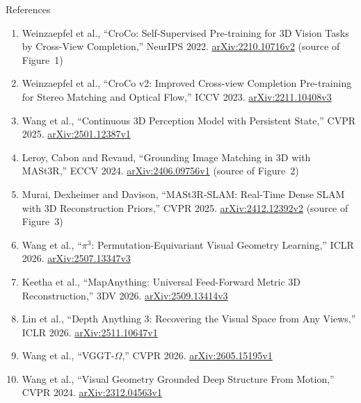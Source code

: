 \begin{frame}[allowframebreaks]{References}
\begin{enumerate}
    \item Weinzaepfel et al., ``CroCo: Self-Supervised Pre-training for 3D Vision Tasks by Cross-View Completion,'' NeurIPS 2022. \href{https://arxiv.org/abs/2210.10716v2}{arXiv:2210.10716v2} (source of Figure~1)
    \item Weinzaepfel et al., ``CroCo v2: Improved Cross-view Completion Pre-training for Stereo Matching and Optical Flow,'' ICCV 2023. \href{https://arxiv.org/abs/2211.10408v3}{arXiv:2211.10408v3}
    \item Wang et al., ``Continuous 3D Perception Model with Persistent State,'' CVPR 2025. \href{https://arxiv.org/abs/2501.12387v1}{arXiv:2501.12387v1}
    \item Leroy, Cabon and Revaud, ``Grounding Image Matching in 3D with MASt3R,'' ECCV 2024. \href{https://arxiv.org/abs/2406.09756v1}{arXiv:2406.09756v1} (source of Figure~2)
    \item Murai, Dexheimer and Davison, ``MASt3R-SLAM: Real-Time Dense SLAM with 3D Reconstruction Priors,'' CVPR 2025. \href{https://arxiv.org/abs/2412.12392v2}{arXiv:2412.12392v2} (source of Figure~3)
    \item Wang et al., ``$\pi^3$: Permutation-Equivariant Visual Geometry Learning,'' ICLR 2026. \href{https://arxiv.org/abs/2507.13347v3}{arXiv:2507.13347v3}
    \item Keetha et al., ``MapAnything: Universal Feed-Forward Metric 3D Reconstruction,'' 3DV 2026. \href{https://arxiv.org/abs/2509.13414v3}{arXiv:2509.13414v3}
    \item Lin et al., ``Depth Anything 3: Recovering the Visual Space from Any Views,'' ICLR 2026. \href{https://arxiv.org/abs/2511.10647v1}{arXiv:2511.10647v1}
    \item Wang et al., ``VGGT-$\Omega$,'' CVPR 2026. \href{https://arxiv.org/abs/2605.15195v1}{arXiv:2605.15195v1}
    \item Wang et al., ``Visual Geometry Grounded Deep Structure From Motion,'' CVPR 2024. \href{https://arxiv.org/abs/2312.04563v1}{arXiv:2312.04563v1}
  \end{enumerate}
\end{frame}
